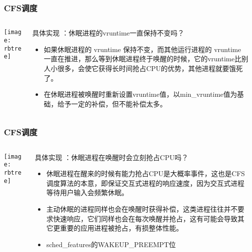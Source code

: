 \begin{frame}
	\frametitle{CFS调度}
	\begin{columns}
		\begin{column}{.4\textwidth}
			\Large \centering
			
			\texttt{[image: rbtree]}
			
		\end{column}
		
		\begin{column}{.6\textwidth}
			
			具体实现 ：休眠进程的vruntime一直保持不变吗？
			\begin{itemize}
				\item 如果休眠进程的 vruntime 保持不变，而其他运行进程的 vruntime 一直在推进，那么等到休眠进程终于唤醒的时候，它的vruntime比别人小很多，会使它获得长时间抢占CPU的优势，其他进程就要饿死了。

				\item 在休眠进程被唤醒时重新设置vruntime值，以min\_vruntime值为基础，给予一定的补偿，但不能补偿太多。
			\end{itemize}
		\end{column}
	\end{columns}
\end{frame}


\begin{frame}
	\frametitle{CFS调度}
	\begin{columns}
		\begin{column}{.4\textwidth}
			\Large \centering
			
			\texttt{[image: rbtree]}
			
		\end{column}
		
		\begin{column}{.6\textwidth}
			
			具体实现 ：休眠进程在唤醒时会立刻抢占CPU吗？
			\begin{itemize}
				\item 休眠进程在醒来的时候有能力抢占CPU是大概率事件，这也是CFS调度算法的本意，即保证交互式进程的响应速度，因为交互式进程等待用户输入会频繁休眠。
				
				\item 主动休眠的进程同样也会在唤醒时获得补偿，这类进程往往并不要求快速响应，它们同样也会在每次唤醒并抢占，这有可能会导致其它更重要的应用进程被抢占，有损整体性能。
				\item sched\_features的WAKEUP\_PREEMPT位
				
			\end{itemize}
		\end{column}
	\end{columns}
\end{frame}


